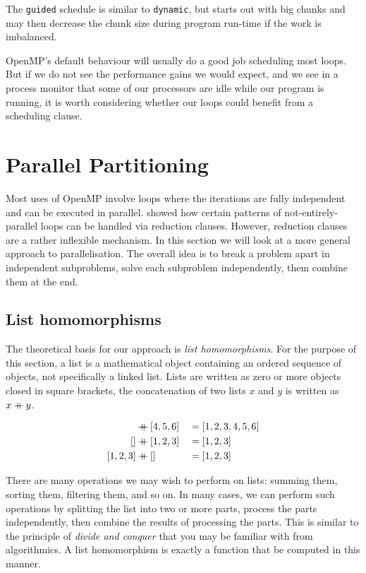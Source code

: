 The \texttt{guided} schedule is similar to \texttt{dynamic}, but
starts out with big chunks and may then decrease the chunk size during
program run-time if the work is imbalanced.

OpenMP's default behaviour will usually do a good job scheduling most
loops.  But if we do not see the performance gains we would expect,
and we see in a process monitor that some of our processors are idle
while our program is running, it is worth considering whether our
loops could benefit from a scheduling clause.

\section{Parallel Partitioning}
\label{sec:parallel-partitioning}

Most uses of OpenMP involve loops where the iterations are fully
independent and can be executed in parallel. 
showed how certain patterns of not-entirely-parallel loops can be
handled via reduction clauses. However, reduction clauses are a rather
inflexible mechanism. In this section we will look at a more general
approach to parallelisation. The overall idea is to break a problem
apart in independent subproblems, solve each subproblem independently,
them combine them at the end.

\subsection{List homomorphisms}

\newcommand\concat{\mathbin{+\mkern-10mu+}}

The theoretical basis for our approach is \emph{list homomorphisms}.
For the purpose of this section, a list is a mathematical object
containing an ordered sequence of objects, not specifically a linked
list. Lists are written as zero or more objects closed in square
brackets, the concatenation of two lists $x$ and $y$ is written as
$x\concat y$.

\begin{example}
  \begin{align}
    [1,2,3]&\concat[4,5,6] &&= [1,2,3,4,5,6] \\
    []&\concat[1,2,3] &&= [1,2,3] \\
    [1,2,3]&\concat[] &&= [1,2,3]
  \end{align}
\end{example}

There are many operations we may wish to perform on lists: summing
them, sorting them, filtering them, and so on. In many cases, we can
perform such operations by splitting the list into two or more parts,
process the parts independently, then combine the results of
processing the parts. This is similar to the principle of \emph{divide
  and conquer} that you may be familiar with from algorithmics. A list
homomorphism is exactly a function that be computed in this manner.

